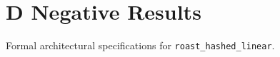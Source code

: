 \section{D Negative Results}

Formal architectural specifications for \texttt{roast_hashed_linear}.
